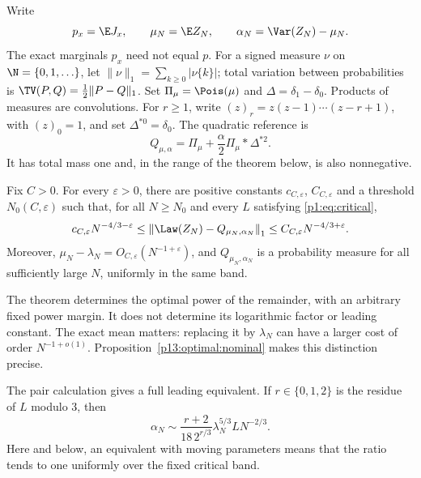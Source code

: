 Write
\[
 p_x=\E J_x,\qquad \mu_N=\E Z_N,\qquad
 \alpha_N=\Var(Z_N)-\mu_N.
\]
The exact marginals \(p_x\) need not equal \(p\).
For a signed measure \(\nu\) on \(\N=\{0,1,\ldots\}\), let
\(\|\nu\|_1=\sum_{k\ge0}|\nu\{k\}|\); total variation between
probabilities is \(\TV(P,Q)=\frac12\|P-Q\|_1\).
Set \(\Pi_\mu=\Pois(\mu)\) and \(\Delta=\delta_1-\delta_0\).
Products of measures are convolutions. For $r\ge1$, write
$(z)_r=z(z-1)\cdots(z-r+1)$, with $(z)_0=1$, and set
$\Delta^{*0}=\delta_0$. The quadratic reference is
\begin{equation}
 Q_{\mu,\alpha}
   =\Pi_\mu+\frac{\alpha}{2}\Pi_\mu*\Delta^{*2}.
 \label{p1:eq:Q}
\end{equation}
It has total mass one and, in the range of the theorem below, is
also nonnegative.

\begin{theorem}
\label{p1:thm:main}
Fix \(C>0\). For every \(\varepsilon>0\), there are positive
constants \(c_{C,\varepsilon}\), \(C_{C,\varepsilon}\) and a threshold
\(N_0(C,\varepsilon)\) such that, for all \(N\ge N_0\) and every
\(L\) satisfying \eqref{p1:eq:critical},
\begin{equation}
 c_{C,\varepsilon}N^{-4/3-\varepsilon}
 \le \left\|\Law(Z_N)-Q_{\mu_N,\alpha_N}\right\|_1
 \le C_{C,\varepsilon}N^{-4/3+\varepsilon}.
 \label{p1:eq:main}
\end{equation}
Moreover,
\(\mu_N-\lambda_N=O_{C,\varepsilon}(N^{-1+\varepsilon})\),
and \(Q_{\mu_N,\alpha_N}\) is a probability measure for all
sufficiently large \(N\), uniformly in the same band.
\end{theorem}

The theorem determines the optimal power of the remainder, with an
arbitrary fixed power margin. It does not determine its logarithmic
factor or leading constant. The exact mean matters: replacing it by
\(\lambda_N\) can have a larger cost of order \(N^{-1+o(1)}\).
Proposition~\ref{p13:optimal:nominal} makes this distinction precise.

The pair calculation gives a full leading equivalent. If
\(r\in\{0,1,2\}\) is the residue of \(L\) modulo \(3\), then
\begin{equation}
 \alpha_N\sim
 \frac{r+2}{18\,2^{r/3}}\lambda_N^{5/3}L N^{-2/3}.
 \label{p1:eq:alpha-leading}
\end{equation}
Here and below, an equivalent with moving parameters means that the
ratio tends to one uniformly over the fixed critical band.

